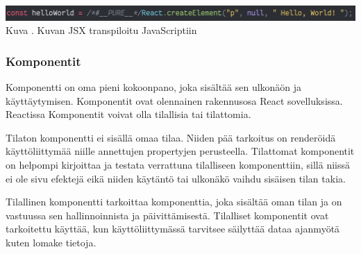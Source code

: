 \bigskip
\includegraphics[width=15cm]{src/public/oppar/transpiled_jsx_example.png}\\
Kuva \getImgCount {}. Kuvan \prevImageCount{} JSX transpiloitu JavaScriptiin
\medskip





\subsubsection{Komponentit}











Komponentti on oma pieni kokoonpano, joka sisältää sen ulkonäön ja käyttäytymisen.
Komponentit ovat olennainen rakennusosa React sovelluksissa.
Reactissa Komponentit voivat olla tilallisia tai tilattomia. 
\medskip



Tilaton komponentti ei sisällä omaa tilaa. 
Niiden pää tarkoitus on renderöidä käyttöliittymää niille annettujen propertyjen perusteella.
Tilattomat komponentit on helpompi kirjoittaa ja testata verrattuna tilalliseen komponenttiin, 
sillä niissä ei ole sivu efektejä eikä niiden käytäntö tai ulkonäkö vaihdu sisäisen tilan takia.
\medskip


Tilallinen komponentti tarkoittaa komponenttia, 
joka sisältää oman tilan ja on vastuussa sen hallinnoinnista ja päivittämisestä.
Tilalliset komponentit ovat tarkoitettu käyttää, kun käyttöliittymässä tarvitsee säilyttää dataa ajanmyötä 
kuten lomake tietoja.\\
\medskip








